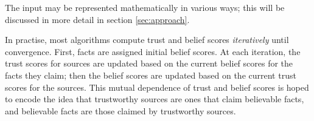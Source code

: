 \documentclass[../main.tex]{subfiles}
\begin{document}

The input may be represented mathematically in various ways; this will be
discussed in more detail in section \ref{sec:approach}. 

In practise, most algorithms compute trust and belief scores \emph{iteratively}
until convergence. First, facts are assigned initial belief scores. At each
iteration, the trust scores for sources are updated based on the current belief
scores for the facts they claim; then the belief scores are updated based on the
current trust scores for the sources. This mutual dependence of trust and
belief scores is hoped to encode the idea that trustworthy sources are ones
that claim believable facts, and believable facts are those claimed by
trustworthy sources.
\end{document}
